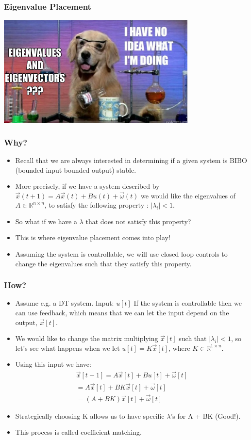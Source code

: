 \documentclass{beamer}
\newcommand{\R}{\mathbb{R}}
\begin{document}
	\begin{frame}
	\frametitle{Eigenvalue Placement} 
	\centering\includegraphics[width = 10cm]{eigenvalue.jpg}
\end{frame}

\begin{frame}
\frametitle{Why?} 
\begin{itemize}
\item Recall that we are always interested in determining if a given system is BIBO (bounded input bounded output) stable. 
\item More precisely, if we have a system described by $\vec{x}(t+1) = A\vec{x}(t) + Bu(t) + \vec{\omega}(t)$ we would like the eigenvalues of $A \in \R^{n \times n}$, to satisfy the following property : $|\lambda_i| < 1$. 
\item So what if we have a $\lambda$ that does not satisfy this property?
\item This is where eigenvalue placement comes into play!
\item Assuming the system is controllable, we will use closed loop controls to change the eigenvalues such that they satisfy this property. 
\end{itemize}
\end{frame}

\begin{frame}
\frametitle{How?}
\begin{itemize}
\item Assume e.g. a DT system. Input: $u[t]$ If the system is controllable then we can use feedback, which means that we can let the input depend on the output, $\vec{x}[t]$.
\item We would like to change the matrix multiplying $\vec{x}[t]$ such that  $|\lambda_i|<1$, so let's see what happens when we let $u[t] = K\vec{x}[t]$, where $K \in \R^{1 \times n}$.
\item Using this input we have: 
\begin{align*}
\vec{x}[t+1] = A\vec{x}[t] + Bu[t] + \vec{\omega}[t]\\
= A\vec{x}[t] + BK\vec{x}[t] + \vec{\omega}[t]\\
= (A + BK)\vec{x}[t] + \vec{\omega}[t]
\end{align*}

\item Strategically choosing K allows us to have specific $\lambda$'s for A + BK (Good!).
\item This process is called coefficient matching. 
\end{itemize}
\end{frame}
\end{document}
